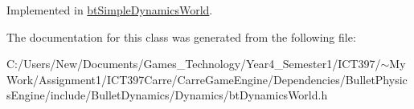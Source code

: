 Implemented in \hyperlink{classbt_simple_dynamics_world_f6b4810b5018cbaf09f82839111a243d}{btSimpleDynamicsWorld}.

The documentation for this class was generated from the following file:\begin{CompactItemize}
\item 
C:/Users/New/Documents/Games\_\-Technology/Year4\_\-Semester1/ICT397/$\sim$My Work/Assignment1/ICT397Carre/CarreGameEngine/Dependencies/BulletPhysicsEngine/include/BulletDynamics/Dynamics/btDynamicsWorld.h\end{CompactItemize}
